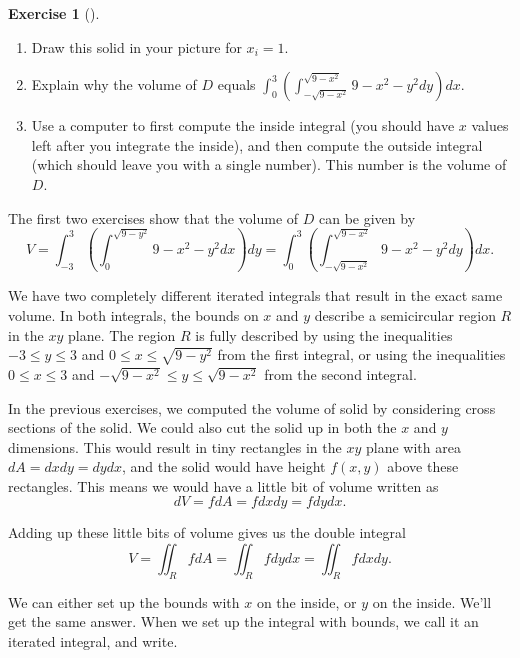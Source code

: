 \documentclass[10pt,]{book}
\theoremstyle{plain}
\theoremstyle{definition}
\theoremstyle{definition}
\theoremstyle{definition}
\theoremstyle{definition}
\newtheorem{exploration}[project]{Exercise}
\theoremstyle{definition}
\numberwithin{equation}{section}
\newcommand{\ds}{\displaystyle}
\begin{document}
\begin{exploration}[]
\begin{enumerate}[font=\bfseries,label=(\alph*),ref=\alph*]
\item\label{task-686} Draw this solid in your picture for \(x_i = 1\).%
\item\label{task-687} Explain why the volume of \(D\) equals \(\ds\int_{0}^{3} \left(\int_{-\sqrt{9-x^2}}^{\sqrt{9-x^2}}9-x^2-y^2 dy\right) dx\).%
\item\label{task-688} Use a computer to first compute the inside integral (you should have \(x\) values left after you integrate the inside), and then compute the outside integral (which should leave you with a single number). This number is the volume of \(D\).%
\end{enumerate}
\end{exploration}
The first two exercises show that the volume of \(D\) can be given by%
\begin{equation*}
V=\ds\int_{-3}^{3} \left(\int_0^{\sqrt{9-y^2}}9-x^2-y^2 dx\right) dy = \ds\int_{0}^{3} \left(\int_{-\sqrt{9-x^2}}^{\sqrt{9-x^2}}9-x^2-y^2 dy\right) dx.
\end{equation*}
%
\par
We have two completely different iterated integrals that result in the exact same volume. In both integrals, the bounds on \(x\) and \(y\) describe a semicircular region \(R\) in the \(xy\) plane. The region \(R\) is fully described by using the inequalities \(-3\leq y\leq 3\) and \(0\leq x\leq \sqrt{9-y^2}\) from the first integral, or using the inequalities \(0\leq x\leq 3\) and \(-\sqrt{9-x^2}\leq y\leq \sqrt{9-x^2}\) from the second integral.%
\par
In the previous exercises, we computed the volume of solid by considering cross sections of the solid. We could also cut the solid up in both the \(x\) and \(y\) dimensions. This would result in tiny rectangles in the \(xy\) plane with area \(dA=dxdy=dydx\), and the solid would have height \(f(x,y)\) above these rectangles. This means we would have a little bit of volume written as%
\begin{equation*}
dV=fdA=fdxdy=fdydx.
\end{equation*}
%
\par
Adding up these little bits of volume gives us the double integral%
\begin{equation*}
V = \iint_R fdA=\iint_R fdydx=\iint_R fdxdy.
\end{equation*}
%
\par
We can either set up the bounds with \(x\) on the inside, or \(y\) on the inside. We'll get the same answer. When we set up the integral with bounds, we call it an iterated integral, and write.%
\end{document}
